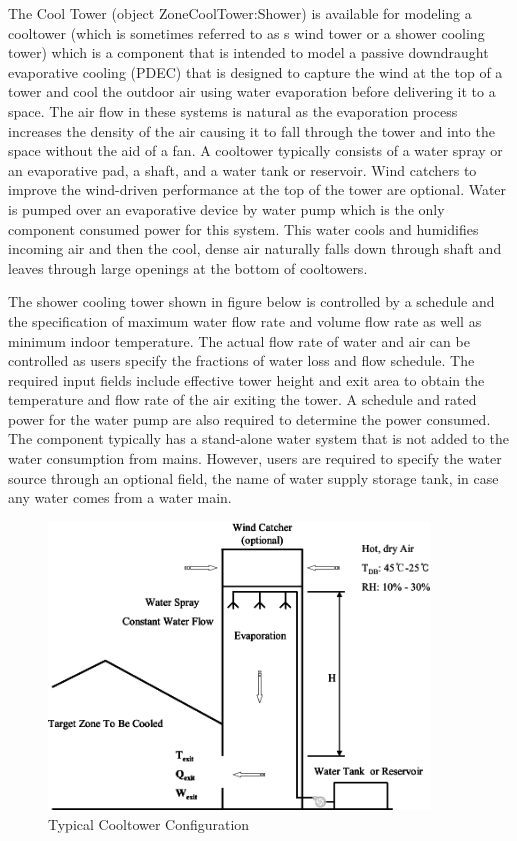 The Cool Tower (object ZoneCoolTower:Shower) is available for modeling a cooltower (which is sometimes referred to as s wind tower or a shower cooling tower) which is a component that is intended to model a passive downdraught evaporative cooling (PDEC) that is designed to capture the wind at the top of a tower and cool the outdoor air using water evaporation before delivering it to a space. The air flow in these systems is natural as the evaporation process increases the density of the air causing it to fall through the tower and into the space without the aid of a fan. A cooltower typically consists of a water spray or an evaporative pad, a shaft, and a water tank or reservoir. Wind catchers to improve the wind-driven performance at the top of the tower are optional. Water is pumped over an evaporative device by water pump which is the only component consumed power for this system. This water cools and humidifies incoming air and then the cool, dense air naturally falls down through shaft and leaves through large openings at the bottom of cooltowers.

The shower cooling tower shown in figure below is controlled by a schedule and the specification of maximum water flow rate and volume flow rate as well as minimum indoor temperature. The actual flow rate of water and air can be controlled as users specify the fractions of water loss and flow schedule. The required input fields include effective tower height and exit area to obtain the temperature and flow rate of the air exiting the tower. A schedule and rated power for the water pump are also required to determine the power consumed. The component typically has a stand-alone water system that is not added to the water consumption from mains. However, users are required to specify the water source through an optional field, the name of water supply storage tank, in case any water comes from a water main.

\begin{figure}[hbtp] %
\centering
\includegraphics[width=0.9\textwidth, height=0.9\textheight, keepaspectratio=true]{media/image7400.svg.png}
\caption{Typical Cooltower Configuration \protect \label{fig:typical-cooltower-configuration}}
\end{figure}

